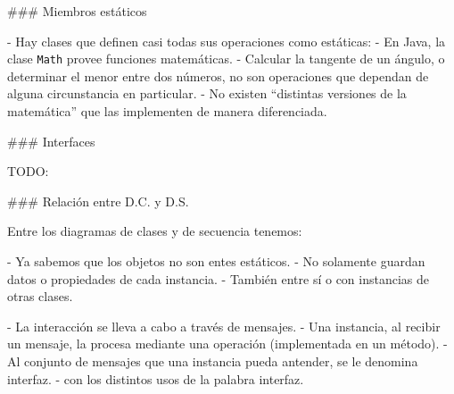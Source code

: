 ### Miembros estáticos


- Hay clases que definen casi todas sus operaciones como estáticas:
    - En Java, la clase \texttt{Math} provee funciones matemáticas.
    - Calcular la tangente de un ángulo, o determinar el menor entre dos números, no son
    operaciones que dependan de alguna circunstancia en particular.
        - No existen ``distintas versiones de la matemática'' que las implementen de manera
        diferenciada.

### Interfaces

TODO:

\subsubtitleB{}


### Relación entre D.C. y D.S.

Entre los diagramas de clases y de secuencia tenemos:

- Ya sabemos que los objetos no son entes estáticos.
    - No solamente guardan datos o propiedades de cada instancia.
    - También  entre sí o con instancias de otras clases.

- La interacción se lleva a cabo a través de \alert{mensajes}.
    - Una instancia, al recibir un mensaje, la procesa mediante una operación (implementada en
    un método).
    - Al conjunto de mensajes que una instancia pueda antender, se le denomina \alert{interfaz}.
        -  con los distintos usos de la palabra interfaz.
